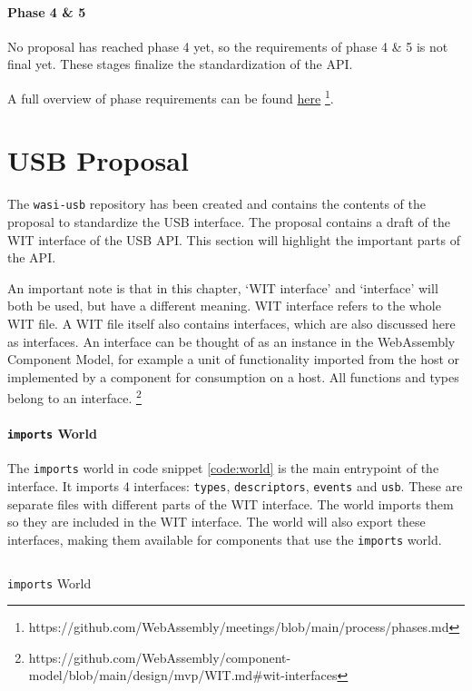 \paragraph{Phase 4 \& 5}

No proposal has reached phase 4 yet, so the requirements of phase 4 \& 5 is not final yet. These stages finalize the standardization of the API.


A full overview of phase requirements can be found \href{https://github.com/WebAssembly/meetings/blob/main/process/phases.md}{here} \footnote{https://github.com/WebAssembly/meetings/blob/main/process/phases.md}.

\section{USB Proposal}
The \texttt{wasi-usb} repository \cite{wasi_usb} has been created and contains the contents of the proposal to standardize the USB interface. The proposal contains a draft of the \acrshort{WIT} interface of the USB API. This section will highlight the important parts of the API.

An important note is that in this chapter, `WIT interface' and `interface' will both be used, but have a different meaning.
WIT interface refers to the whole WIT file.
A WIT file itself also contains interfaces, which are also discussed here as interfaces. An interface can be thought of as an instance in the WebAssembly Component Model, for example a unit of functionality imported from the host or implemented by a component for consumption on a host. All functions and types belong to an interface. \footnote{https://github.com/WebAssembly/component-model/blob/main/design/mvp/WIT.md\#wit-interfaces}

\paragraph{\texttt{imports} World}
The \texttt{imports} world in code snippet \ref{code:world} is the main entrypoint of the interface. It imports 4 interfaces: \texttt{types}, \texttt{descriptors}, \texttt{events} and \texttt{usb}. These are separate files with different parts of the WIT interface. The world imports them so they are included in the WIT interface. The world will also export these interfaces, making them available for components that use the \texttt{imports} world.\\

\begin{code}
\inputminted[breaklines]{text}{WIT/wit/world.wit}
\caption{\texttt{imports} World}
\label{code:world}
\end{code}

